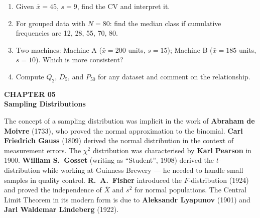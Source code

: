 \documentclass[12pt]{article}
\begin{document}
\begin{practicebox}
\begin{enumerate}[label=\textbf{Q\arabic*.},noitemsep]
  \item Given $\bar x=45$, $s=9$, find the CV and interpret it.
  \item For grouped data with $N=80$: find the median class if cumulative frequencies are 12, 28, 55, 70, 80.
  \item Two machines: Machine A ($\bar x=200$ units, $s=15$); Machine B ($\bar x=185$ units, $s=10$). Which is more consistent?
  \item Compute $Q_2$, $D_5$, and $P_{50}$ for any dataset and comment on the relationship.
\end{enumerate}
\end{practicebox}

\newpage

\begin{tcolorbox}[enhanced,arc=0pt,boxrule=0pt,colback=primary,colframe=primary,
  left=16pt,right=16pt,top=14pt,bottom=10pt,borderline south={4pt}{0pt}{accent}]
  {\color{accent!70}\small\bfseries CHAPTER 05}\\[4pt]
  {\LARGE\bfseries\color{white}Sampling Distributions}
\end{tcolorbox}
\vspace{10pt}

\begin{histbox}
The concept of a sampling distribution was implicit in the work of \textbf{Abraham de Moivre} (1733), who proved the normal approximation to the binomial. \textbf{Carl Friedrich Gauss} (1809) derived the normal distribution in the context of measurement errors. The $\chi^2$ distribution was characterised by \textbf{Karl Pearson} in 1900. \textbf{William S.\ Gosset} (writing as ``Student'', 1908) derived the $t$-distribution while working at Guinness Brewery --- he needed to handle small samples in quality control. \textbf{R.\ A.\ Fisher} introduced the $F$-distribution (1924) and proved the independence of $\bar X$ and $s^2$ for normal populations. The Central Limit Theorem in its modern form is due to \textbf{Aleksandr Lyapunov} (1901) and \textbf{Jarl Waldemar Lindeberg} (1922).
\end{histbox}

\bigskip
\end{document}
